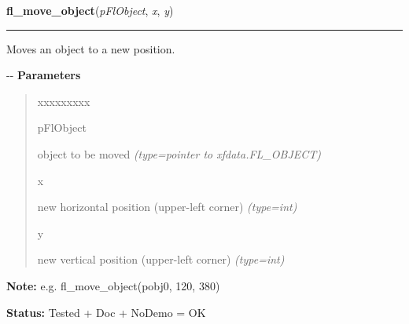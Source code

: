     \vspace{0.5ex}

\hspace{.8\funcindent}\begin{boxedminipage}{\funcwidth}

    \raggedright \textbf{fl\_move\_object}(\textit{pFlObject}, \textit{x}, \textit{y})

    \vspace{-1.5ex}

    \rule{\textwidth}{0.5\fboxrule}
\setlength{\parskip}{2ex}

Moves an object to a new position.

-{}-
\setlength{\parskip}{1ex}
      \textbf{Parameters}
      \vspace{-1ex}

      \begin{quote}
        \begin{Ventry}{xxxxxxxxx}

          \item[pFlObject]


object to be moved
            {\it (type=pointer to xfdata.FL\_OBJECT)}

          \item[x]


new horizontal position (upper-left corner)
            {\it (type=int)}

          \item[y]


new vertical position (upper-left corner)
            {\it (type=int)}

        \end{Ventry}

      \end{quote}

\textbf{Note:} 
e.g. fl\_move\_object(pobj0, 120, 380)


\textbf{Status:} 
Tested + Doc + NoDemo = OK


    \end{boxedminipage}

    \label{xformslib:flbasic:fl_fit_object_label}

    \vspace{0.5ex}

